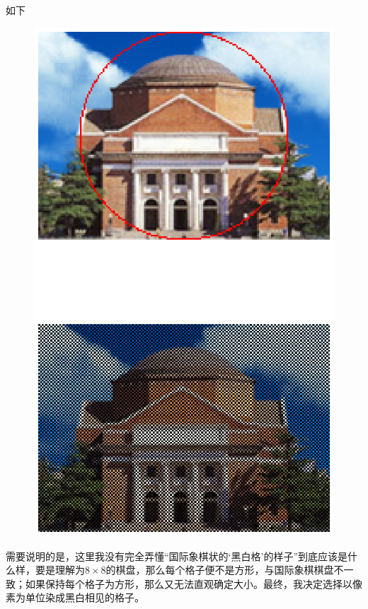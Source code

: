 \documentclass{article}
\begin{document}
\par 如下\begin{figure}\begin{center}\includegraphics[width=\textwidth]{A3_1_2.eps}\end{center}\end{figure}
需要说明的是，这里我没有完全弄懂“国际象棋状的‘黑白格’的样子”到底应该是什么样，要是理解为$8\times8$的棋盘，那么每个格子便不是方形，与国际象棋棋盘不一致；如果保持每个格子为方形，那么又无法直观确定大小。最终，我决定选择以像素为单位染成黑白相见的格子。
\section{}
\end{document}
